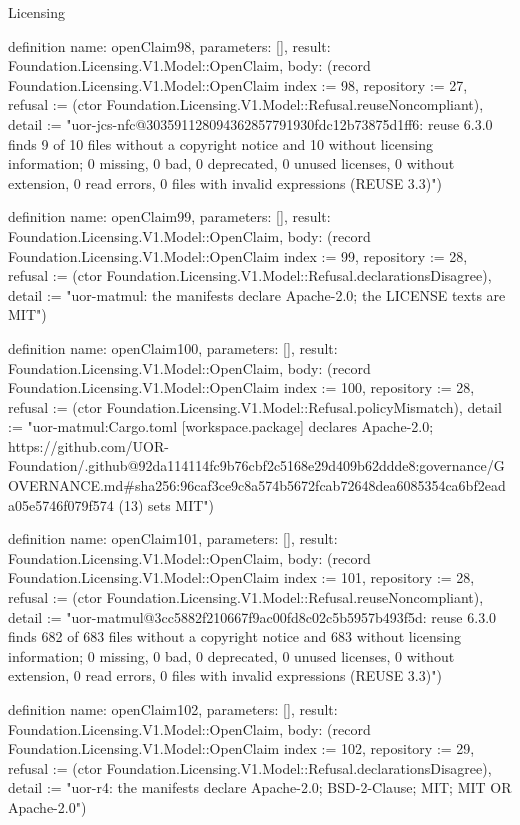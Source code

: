 \begin{lexlean}{Licensing}
\begin{semanticmodule}
definition{
  name: openClaim98,
  parameters: [],
  result: Foundation.Licensing.V1.Model::OpenClaim,
  body: (record Foundation.Licensing.V1.Model::OpenClaim {index := 98, repository := 27, refusal := (ctor Foundation.Licensing.V1.Model::Refusal.reuseNoncompliant), detail := "uor-jcs-nfc@303591128094362857791930fdc12b73875d1ff6: reuse 6.3.0 finds 9 of 10 files without a copyright notice and 10 without licensing information; 0 missing, 0 bad, 0 deprecated, 0 unused licenses, 0 without extension, 0 read errors, 0 files with invalid expressions (REUSE 3.3)"})
}

definition{
  name: openClaim99,
  parameters: [],
  result: Foundation.Licensing.V1.Model::OpenClaim,
  body: (record Foundation.Licensing.V1.Model::OpenClaim {index := 99, repository := 28, refusal := (ctor Foundation.Licensing.V1.Model::Refusal.declarationsDisagree), detail := "uor-matmul: the manifests declare Apache-2.0; the LICENSE texts are MIT"})
}

definition{
  name: openClaim100,
  parameters: [],
  result: Foundation.Licensing.V1.Model::OpenClaim,
  body: (record Foundation.Licensing.V1.Model::OpenClaim {index := 100, repository := 28, refusal := (ctor Foundation.Licensing.V1.Model::Refusal.policyMismatch), detail := "uor-matmul:Cargo.toml [workspace.package] declares Apache-2.0; https://github.com/UOR-Foundation/.github@92da114114fc9b76cbf2c5168e29d409b62ddde8:governance/GOVERNANCE.md#sha256:96caf3ce9c8a574b5672fcab72648dea6085354ca6bf2eada05e5746f079f574 (13) sets MIT"})
}

definition{
  name: openClaim101,
  parameters: [],
  result: Foundation.Licensing.V1.Model::OpenClaim,
  body: (record Foundation.Licensing.V1.Model::OpenClaim {index := 101, repository := 28, refusal := (ctor Foundation.Licensing.V1.Model::Refusal.reuseNoncompliant), detail := "uor-matmul@3cc5882f210667f9ac00fd8c02c5b5957b493f5d: reuse 6.3.0 finds 682 of 683 files without a copyright notice and 683 without licensing information; 0 missing, 0 bad, 0 deprecated, 0 unused licenses, 0 without extension, 0 read errors, 0 files with invalid expressions (REUSE 3.3)"})
}

definition{
  name: openClaim102,
  parameters: [],
  result: Foundation.Licensing.V1.Model::OpenClaim,
  body: (record Foundation.Licensing.V1.Model::OpenClaim {index := 102, repository := 29, refusal := (ctor Foundation.Licensing.V1.Model::Refusal.declarationsDisagree), detail := "uor-r4: the manifests declare Apache-2.0; BSD-2-Clause; MIT; MIT OR Apache-2.0"})
}


\end{semanticmodule}
\end{lexlean}
